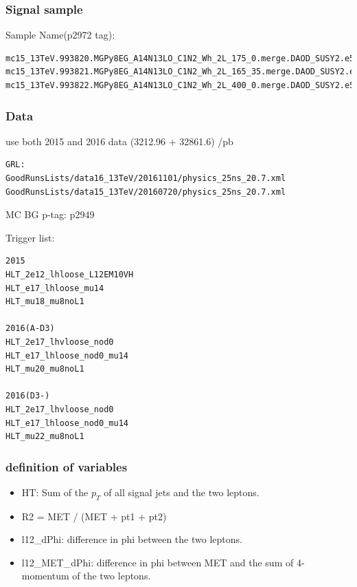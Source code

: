 \documentclass[mathserif,serif]{beamer}
\begin{document}



\begin{frame}[fragile]
\frametitle{Signal sample}
\small
Sample Name(p2972 tag):
\tiny
\begin{verbatim}
mc15_13TeV.993820.MGPy8EG_A14N13LO_C1N2_Wh_2L_175_0.merge.DAOD_SUSY2.e5678_a766_a821_r7676_p2949_p2972
mc15_13TeV.993821.MGPy8EG_A14N13LO_C1N2_Wh_2L_165_35.merge.DAOD_SUSY2.e5678_a766_a821_r7676_p2949_p2972
mc15_13TeV.993822.MGPy8EG_A14N13LO_C1N2_Wh_2L_400_0.merge.DAOD_SUSY2.e5678_a766_a821_r7676_p2949_p2972
\end{verbatim}
\end{frame}

\begin{frame}[fragile]
\frametitle{Data}
\small
use both 2015 and 2016 data (3212.96 + 32861.6) /pb
\tiny
\begin{verbatim}
GRL:
GoodRunsLists/data16_13TeV/20161101/physics_25ns_20.7.xml
GoodRunsLists/data15_13TeV/20160720/physics_25ns_20.7.xml
\end{verbatim}
\end{frame}

\begin{frame}{MC BG}
p-tag: p2949
\end{frame}

\begin{frame}[fragile]
\small
Trigger list:\\
\scriptsize
\begin{verbatim}
2015
HLT_2e12_lhloose_L12EM10VH
HLT_e17_lhloose_mu14
HLT_mu18_mu8noL1

2016(A-D3)
HLT_2e17_lhvloose_nod0
HLT_e17_lhloose_nod0_mu14
HLT_mu20_mu8noL1

2016(D3-)
HLT_2e17_lhvloose_nod0
HLT_e17_lhloose_nod0_mu14
HLT_mu22_mu8noL1
\end{verbatim}
\end{frame}

\begin{frame}
\frametitle{definition of variables}
\normalsize
\begin{itemize}
\item HT: Sum of the $p_T$ of all signal jets and the two leptons.
\item R2 = MET / (MET + pt1 + pt2)
\item l12\_dPhi: difference in phi between the two leptons.
\item l12\_MET\_dPhi: difference in phi between MET and the sum of 4-momentum of the two leptons.
\end{itemize}
\end{frame}
\end{document}
